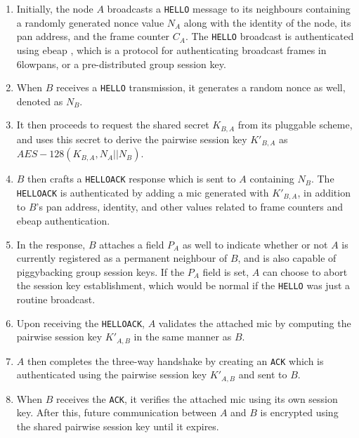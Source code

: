 \begin{enumerate}

\item  Initially, the node $A$ broadcasts a \texttt{HELLO} message to its neighbours containing a randomly generated nonce value $N_A$ along with the identity of the node, its \gls{pan} address, and the frame counter $C_A$. The \texttt{HELLO} broadcast is authenticated using \gls{ebeap} \cite{krentz20136lowpan}, which is a protocol for authenticating broadcast frames in \gls{6lowpan}s, or a pre-distributed group session key.

\item When $B$ receives a \texttt{HELLO} transmission, it generates a random nonce as well, denoted as $N_B$.

\item It then proceeds to request the shared secret $K_{B,A}$ from its pluggable scheme, and uses this secret to derive the pairwise session key $K'_{B,A}$ as\\ $AES-128(K_{B,A}, N_A || N_B)$.

\item $B$ then crafts a \texttt{HELLOACK} response which is sent to $A$ containing $N_B$. The \texttt{HELLOACK} is authenticated by adding a \gls{mic} generated with $K'_{B,A}$, in addition to $B$'s \gls{pan} address, identity, and other values related to frame counters and \gls{ebeap} authentication.

\item In the response, $B$ attaches a field $P_A$ as well to indicate whether or not $A$ is currently registered as a permanent neighbour of $B$, and is also capable of piggybacking group session keys. If the $P_A$ field is set, $A$ can choose to abort the session key establishment, which would be normal if the \texttt{HELLO} was just a routine broadcast.

\item  Upon receiving the \texttt{HELLOACK}, $A$ validates the attached \gls{mic} by computing the pairwise session key $K'_{A, B}$ in the same manner as $B$.

\item $A$ then completes the three-way handshake by creating an \texttt{ACK} which is authenticated using the pairwise session key $K'_{A, B}$ and sent to $B$.


\item  When $B$ receives the \texttt{ACK}, it verifies the attached \gls{mic} using its own session key. After this, future communication between $A$ and $B$ is encrypted using the shared pairwise session key until it expires.


\end{enumerate}

